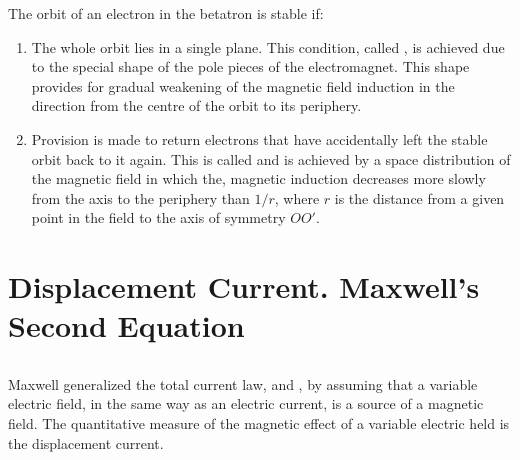 The orbit of an electron in the betatron is stable if:
\begin{enumerate}[label=(\alph*)]
\item The whole orbit lies in a single plane. This condition, called , is achieved due to the special shape of the pole pieces of the electromagnet. This shape provides for gradual weakening of the magnetic field induction in the direction from the centre of the orbit to its periphery.
\item Provision is made to return electrons that have accidentally left the stable orbit back to it again. This is called  and is achieved by a space distribution of the magnetic field in which the, magnetic induction decreases more slowly from the axis to the periphery than $1/r$, where $r$ is the distance from a given point in the field to the axis of symmetry $OO'$.
\end{enumerate}

\section{Displacement Current. Maxwell's Second Equation}
\label{sec-27.3}

\subsection{}\label{27.3.1} Maxwell generalized the total current law,  and , by assuming that a variable electric field, in the same way as an electric current, is a source of a magnetic field. The quantitative measure of the magnetic effect of a variable electric held is the displacement current.

